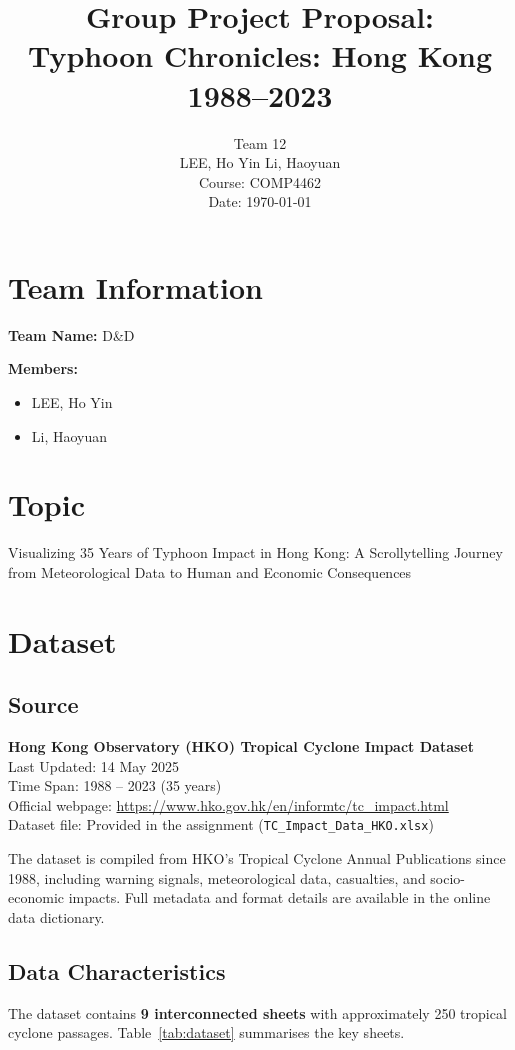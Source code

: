 \documentclass[a4paper,12pt]{article}
\title{Group Project Proposal: \\[0.5em]
\Large \textbf{Typhoon Chronicles: Hong Kong 1988–2023}}
\author{Team 12 \\[0.5em]
LEE, Ho Yin \quad Li, Haoyuan \\[1em]
\small Course: COMP4462 \\ \small Date: \today}
\date{}
\begin{document}
\maketitle

\section{Team Information}

\textbf{Team Name:} D\&D

\textbf{Members:}
\begin{itemize}
    \item LEE, Ho Yin
    \item Li, Haoyuan
\end{itemize}

\section{Topic}

Visualizing 35 Years of Typhoon Impact in Hong Kong: A Scrollytelling Journey from Meteorological Data to Human and Economic Consequences

\section{Dataset}

\subsection{Source}
\textbf{Hong Kong Observatory (HKO) Tropical Cyclone Impact Dataset} \\
Last Updated: 14 May 2025 \\
Time Span: 1988 – 2023 (35 years) \\
Official webpage: \url{https://www.hko.gov.hk/en/informtc/tc_impact.html} \\
Dataset file: Provided in the assignment (\texttt{TC\_Impact\_Data\_HKO.xlsx})

The dataset is compiled from HKO's Tropical Cyclone Annual Publications since 1988, including warning signals, meteorological data, casualties, and socio-economic impacts. Full metadata and format details are available in the online data dictionary.

\subsection{Data Characteristics}
The dataset contains \textbf{9 interconnected sheets} with approximately 250 tropical cyclone passages. Table~\ref{tab:dataset} summarises the key sheets.
\end{document}

